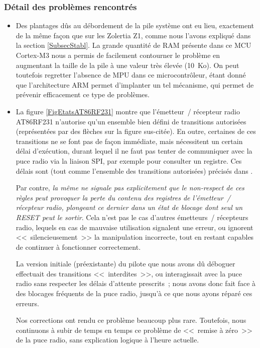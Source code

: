 \subsubsection{Détail des problèmes rencontrés}
\label{ParDetailsTech}

\begin{itemize}

\item Des plantages dûs au débordement de la pile système ont eu lieu,
exactement de la même façon que sur les Zolertia Z1, comme nous
l'avons expliqué dans la section \vref{SubsecStabl}. La grande quantité
de RAM présente dans ce MCU Cortex-M3 nous a permis de facilement contourner
le problème en augmentant la taille de la pile à une valeur très élevée
(10~Ko). On peut toutefois regretter l'absence de MPU dans ce
microcontrôleur, étant donné que l'architecture ARM permet d'implanter un
tel mécanisme, qui permet de prévenir efficacement ce type de problèmes.

\item La figure \vref{FigEtatsAT86RF231} montre que l'émetteur~/ récepteur
radio AT86RF231 n'autorise qu'un ensemble bien défini de transitions
autorisées (représentées par des flèches sur la figure sus-citée).
En outre, certaines de ces transitions ne se font pas de façon immédiate,
mais nécessitent un certain délai d'exécution, durant lequel il ne faut
pas tenter de communiquer avec la puce radio via la liaison SPI,
par exemple pour consulter un registre. Ces délais sont (tout comme
l'ensemble des transitions autorisées) précisés dans \cite{DSAT86RF231}.

Par contre, \emph{la même \cite{DSAT86RF231} ne signale pas explicitement
que le non-respect de ces règles peut provoquer la perte du contenu des
registres de l'émetteur~/ récepteur radio, plongeant ce dernier dans un
état de blocage dont seul un RESET peut le sortir}. Cela n'est pas le cas
d'autres émetteurs~/ récepteurs radio, lequels en cas de mauvaise
utilisation signalent une erreur, ou ignorent <<~silencieusement~>>
la manipulation incorrecte, tout en restant capables de continuer
à fonctionner correctement.

La version initiale (préexistante) du pilote que nous avons dû déboguer
effectuait des transitions <<~interdites~>>, ou interagissait avec la
puce radio sans respecter les délais d'attente prescrits~; nous avons
donc fait face à des blocages fréquents de la puce radio, jusqu'à
ce que nous ayons réparé ces erreurs.

Nos corrections ont rendu ce problème beaucoup plus rare. Toutefois,
nous continuons à subir de temps en temps ce problème de <<~remise à zéro~>>
de la puce radio, sans explication logique à l'heure actuelle. 


\end{itemize}
